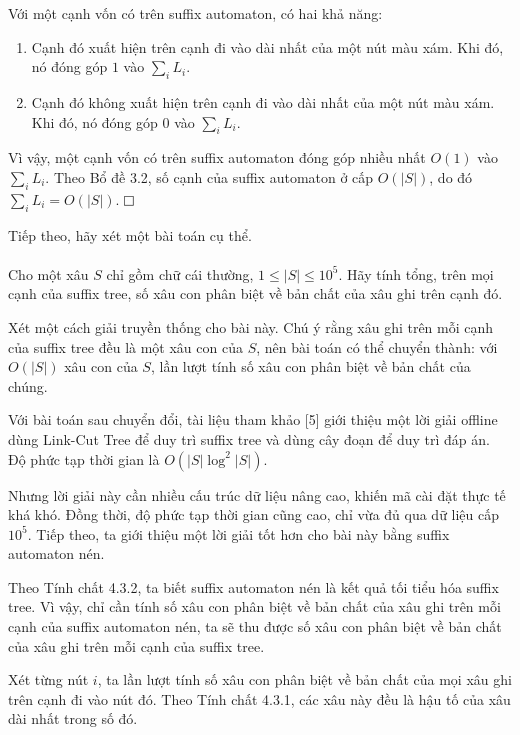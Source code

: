 \documentclass[11pt]{article}
\newcommand{\proofbox}{\ensuremath{\vcenter{\hrule height 0.45pt
  \hbox{\vrule width 0.45pt height 6pt\kern 6pt\vrule width 0.45pt}
  \hrule height 0.45pt}}}
\begin{document}
Với một cạnh vốn có trên suffix automaton, có hai khả năng:

\begin{enumerate}
  \item Cạnh đó xuất hiện trên cạnh đi vào dài nhất của một nút màu xám. Khi
  đó, nó đóng góp \(1\) vào \(\sum_i L_i\).
  \item Cạnh đó không xuất hiện trên cạnh đi vào dài nhất của một nút màu xám.
  Khi đó, nó đóng góp \(0\) vào \(\sum_i L_i\).
\end{enumerate}

Vì vậy, một cạnh vốn có trên suffix automaton đóng góp nhiều nhất \(O(1)\) vào
\(\sum_i L_i\). Theo Bổ đề 3.2, số cạnh của suffix automaton ở cấp \(O(|S|)\),
do đó \(\sum_i L_i=O(|S|)\). \proofbox

Tiếp theo, hãy xét một bài toán cụ thể.

\paragraph{}
Cho một xâu \(S\) chỉ gồm chữ cái thường, \(1\le |S|\le 10^5\). Hãy tính tổng,
trên mọi cạnh của suffix tree, số xâu con phân biệt về bản chất của xâu ghi
trên cạnh đó.

Xét một cách giải truyền thống cho bài này. Chú ý rằng xâu ghi trên mỗi cạnh
của suffix tree đều là một xâu con của \(S\), nên bài toán có thể chuyển thành:
với \(O(|S|)\) xâu con của \(S\), lần lượt tính số xâu con phân biệt về bản chất
của chúng.

Với bài toán sau chuyển đổi, tài liệu tham khảo [5] giới thiệu một lời giải
offline dùng Link-Cut Tree để duy trì suffix tree và dùng cây đoạn để duy trì
đáp án. Độ phức tạp thời gian là \(O(|S|\log^2 |S|)\).

Nhưng lời giải này cần nhiều cấu trúc dữ liệu nâng cao, khiến mã cài đặt thực
tế khá khó. Đồng thời, độ phức tạp thời gian cũng cao, chỉ vừa đủ qua dữ liệu
cấp \(10^5\). Tiếp theo, ta giới thiệu một lời giải tốt hơn cho bài này bằng
suffix automaton nén.

Theo Tính chất 4.3.2, ta biết suffix automaton nén là kết quả tối tiểu hóa
suffix tree. Vì vậy, chỉ cần tính số xâu con phân biệt về bản chất của xâu ghi
trên mỗi cạnh của suffix automaton nén, ta sẽ thu được số xâu con phân biệt về
bản chất của xâu ghi trên mỗi cạnh của suffix tree.

Xét từng nút \(i\), ta lần lượt tính số xâu con phân biệt về bản chất của mọi
xâu ghi trên cạnh đi vào nút đó. Theo Tính chất 4.3.1, các xâu này đều là hậu
tố của xâu dài nhất trong số đó.
\end{document}
